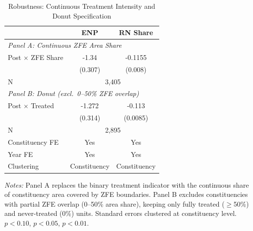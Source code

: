 \begin{table}[H]
\centering
\caption{Robustness: Continuous Treatment Intensity and Donut Specification}
\label{tab:robustness}
\begin{threeparttable}
\begin{tabular}{lcc}
\toprule
 & ENP & RN Share \\
\midrule
\multicolumn{3}{l}{\textit{Panel A: Continuous ZFE Area Share}} \\[3pt]
Post $\times$ ZFE Share & -1.34\sym{***} & -0.1155\sym{***} \\
 & (0.307) & (0.008) \\
N & \multicolumn{2}{c}{3,405} \\[6pt]
\multicolumn{3}{l}{\textit{Panel B: Donut (excl.\ 0--50\% ZFE overlap)}} \\[3pt]
Post $\times$ Treated & -1.272\sym{***} & -0.113\sym{***} \\
 & (0.314) & (0.0085) \\
N & \multicolumn{2}{c}{2,895} \\[6pt]
\midrule
Constituency FE & Yes & Yes \\
Year FE & Yes & Yes \\
Clustering & Constituency & Constituency \\
\bottomrule
\end{tabular}
\begin{tablenotes}[flushleft]
\small
\item \textit{Notes:} Panel A replaces the binary treatment indicator with the continuous share of constituency area covered by ZFE boundaries. Panel B excludes constituencies with partial ZFE overlap (0--50\% area share), keeping only fully treated ($\geq$50\%) and never-treated (0\%) units.  Standard errors clustered at constituency level. \sym{*} $p<0.10$, \sym{**} $p<0.05$, \sym{***} $p<0.01$.
\end{tablenotes}
\end{threeparttable}
\end{table}
